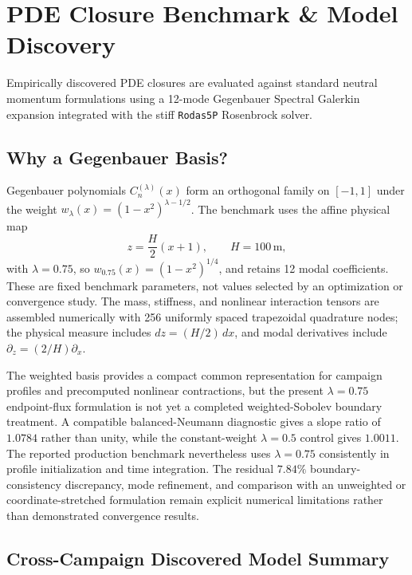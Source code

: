 \documentclass[11pt,a4paper]{article}
\begin{document}
\clearpage
\section{PDE Closure Benchmark \& Model Discovery}

Empirically discovered PDE closures are evaluated against standard neutral momentum formulations using a 12-mode Gegenbauer Spectral Galerkin expansion integrated with the stiff \texttt{Rodas5P} Rosenbrock solver.

\subsection{Why a Gegenbauer Basis?}

Gegenbauer polynomials $C_n^{(\lambda)}(x)$ form an orthogonal family on $[-1,1]$ under the weight $w_\lambda(x)=(1-x^2)^{\lambda-1/2}$. The benchmark uses the affine physical map
\begin{equation}
    z=\frac{H}{2}(x+1), \qquad H=100\,\mathrm{m},
\end{equation}
with $\lambda=0.75$, so $w_{0.75}(x)=(1-x^2)^{1/4}$, and retains 12 modal coefficients. These are fixed benchmark parameters, not values selected by an optimization or convergence study. The mass, stiffness, and nonlinear interaction tensors are assembled numerically with 256 uniformly spaced trapezoidal quadrature nodes; the physical measure includes $dz=(H/2)\,dx$, and modal derivatives include $\partial_z=(2/H)\partial_x$.

The weighted basis provides a compact common representation for campaign profiles and precomputed nonlinear contractions, but the present $\lambda=0.75$ endpoint-flux formulation is not yet a completed weighted-Sobolev boundary treatment. A compatible balanced-Neumann diagnostic gives a slope ratio of $1.0784$ rather than unity, while the constant-weight $\lambda=0.5$ control gives $1.0011$. The reported production benchmark nevertheless uses $\lambda=0.75$ consistently in profile initialization and time integration. The residual $7.84\%$ boundary-consistency discrepancy, mode refinement, and comparison with an unweighted or coordinate-stretched formulation remain explicit numerical limitations rather than demonstrated convergence results.

\subsection{Cross-Campaign Discovered Model Summary}
\end{document}

